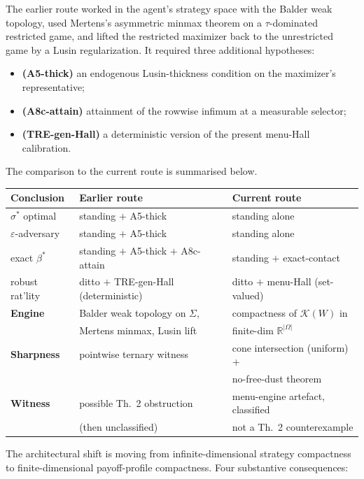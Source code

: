 \documentclass[11pt]{article}
\theoremstyle{definition}
\theoremstyle{remark}
\newcommand{\R}{\mathbb{R}}
\newcommand{\eps}{\varepsilon}
\newcommand{\Om}{\Omega}
\newcommand{\Si}{\Sigma}
\begin{document}
The earlier route worked in the agent's strategy space with the
Balder weak topology, used Mertens's asymmetric minmax theorem on a
$\tau$-dominated restricted game, and lifted the restricted maximizer
back to the unrestricted game by a Lusin regularization. It required
three additional hypotheses:
\begin{itemize}[leftmargin=2em]
\item \textbf{(A5-thick)} an endogenous Lusin-thickness condition on
the maximizer's representative;
\item \textbf{(A8c-attain)} attainment of the rowwise infimum at a
measurable selector;
\item \textbf{(TRE-gen-Hall)} a deterministic version of the present
menu-Hall calibration.
\end{itemize}
The comparison to the current route is summarised below.

\begin{center}
\begin{tabular}{lll}
\hline
\textbf{Conclusion} & \textbf{Earlier route} & \textbf{Current route}\\
\hline
$\sigma^*$ optimal & standing $+$ A5-thick & standing alone\\
$\eps$-adversary    & standing $+$ A5-thick & standing alone\\
exact $\beta^*$    & standing $+$ A5-thick $+$ A8c-attain & standing $+$ exact-contact\\
robust rat'lity   & ditto $+$ TRE-gen-Hall (deterministic) & ditto $+$ menu-Hall (set-valued)\\
\hline
\textbf{Engine}    & Balder weak topology on $\Si$, & compactness of $\mathcal K(W)$ in\\
                   & Mertens minmax, Lusin lift     & finite-dim $\R^{|\Om|}$\\
\hline
\textbf{Sharpness} & pointwise ternary witness     & cone intersection (uniform) +\\
                   &                               & no-free-dust theorem\\
\hline
\textbf{Witness} & possible Th.~2 obstruction     & menu-engine artefact, classified\\
                 & (then unclassified)            & not a Th.~2 counterexample\\
\hline
\end{tabular}
\end{center}

The architectural shift is moving from infinite-dimensional strategy
compactness to finite-dimensional payoff-profile compactness. Four
substantive consequences:
\end{document}

